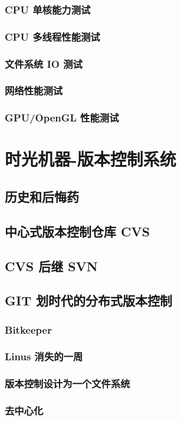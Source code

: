 \documentclass[amstex,twoside]{ctexbook}
\begin{document}
\subsection{  CPU 单核能力测试}
\subsection{  CPU 多线程性能测试}
\subsection{  文件系统 IO 测试}
\subsection{  网络性能测试}
\subsection{  GPU/OpenGL 性能测试}


\chapter{时光机器-版本控制系统}
\section{   历史和后悔药	}
\section{   中心式版本控制仓库 CVS	}
\section{   CVS 后继 SVN	}
\section{GIT 划时代的分布式版本控制\label{sec:git}}
\subsection{  Bitkeeper	}
\subsection{  Linus 消失的一周	}
\subsection{  版本控制设计为一个文件系统	}
\subsection{ 去中心化	}
\end{document}
